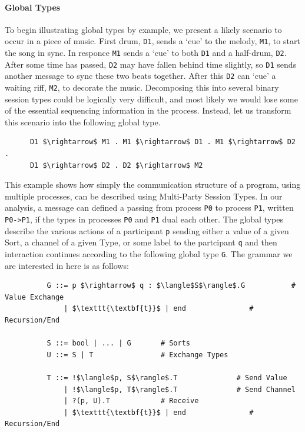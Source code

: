 \documentclass[11pt, abstracton, twoside, titlepage=true]{scrartcl}
\begin{document}
\paragraph{Global Types}
To begin illustrating global types by example, we present a likely scenario to occur 
in a piece of music. First drum, \texttt{D1}, sends a `cue' to the melody, 
\texttt{M1}, to start the song in sync. In responce \texttt{M1} sends a `cue' to 
both \texttt{D1} and a half-drum, \texttt{D2}.  After some time has passed, 
\texttt{D2} may have fallen behind time slightly, so \texttt{D1} sends another 
message to sync these two beats together. After this \texttt{D2} can `cue' a waiting 
riff, \texttt{M2}, to decorate the music. Decomposing this into several binary 
session types could be logically very difficult, and most likely we would lose some 
of the essential sequencing information in the process. Instead, let us transform 
this scenario into the following global type.
\\
\begin{lstlisting}
      D1 $\rightarrow$ M1 . M1 $\rightarrow$ D1 . M1 $\rightarrow$ D2 .
      D1 $\rightarrow$ D2 . D2 $\rightarrow$ M2 
\end{lstlisting}

This example shows how simply the communication structure of a program, using 
multiple processes, can be described using Multi-Party Session Types. 
In our analysis, a message can defined a passing from process \texttt{P0} to 
process \texttt{P1}, written \texttt{P0->P1}, if the types in processes \texttt{P0} 
and \texttt{P1} dual each other. The global types describe the various actions of a 
participant \texttt{p} sending either a value of a given Sort, a channel of a given 
Type, or some label to the partcipant \texttt{q} and then interaction continues 
according to the following global type \texttt{G}. The grammar we are interested in 
here is as follows:
\\
\begin{lstlisting}
          G ::= p $\rightarrow$ q : $\langle$S$\rangle$.G           # Value Exchange
              | $\texttt{\textbf{t}}$ | end               # Recursion/End
      
          S ::= bool | ... | G       # Sorts
          U ::= S | T                # Exchange Types
      
          T ::= !$\langle$p, S$\rangle$.T              # Send Value
              | !$\langle$p, T$\rangle$.T              # Send Channel
              | ?(p, U).T            # Receive
              | $\texttt{\textbf{t}}$ | end               # Recursion/End
\end{lstlisting}
\end{document}
